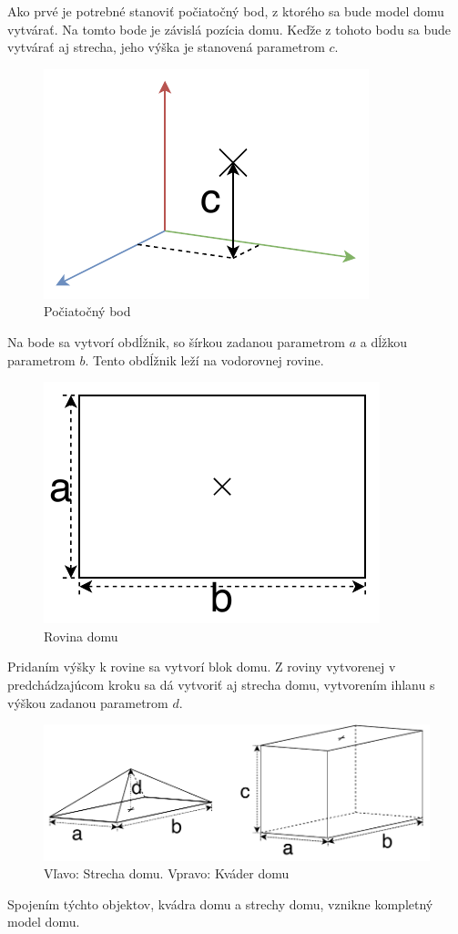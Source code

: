 Ako prvé je potrebné  stanoviť počiatočný bod, z ktorého sa bude model domu vytvárať. Na tomto bode je závislá pozícia domu. Keďže z tohoto bodu sa bude vytvárať aj strecha, jeho výška je stanovená parametrom $c$.\nopagebreak
\begin{figure}[H]
	\centering
	\includegraphics[height=0.3\textwidth]{obrazky-figures/Examples/B1.pdf}
	\caption{Počiatočný bod }
	\label{fig:B1}
\end{figure}
Na bode sa vytvorí obdĺžnik, so šírkou zadanou parametrom $a$ a dĺžkou parametrom $b$. Tento obdĺžnik leží na vodorovnej rovine.\nopagebreak
\begin{figure}[H]
	\centering
	\includegraphics[height=0.3\textwidth]{obrazky-figures/Examples/B2.pdf}
	\caption{Rovina domu}
	\label{fig:B2}
\end{figure}
Pridaním výšky k rovine sa vytvorí blok domu. Z roviny vytvorenej v predchádzajúcom kroku sa dá vytvoriť aj strecha domu, vytvorením ihlanu s výškou zadanou parametrom $d$. \nopagebreak
\begin{figure}[H]
	\centering
	\includegraphics[height=0.3\textwidth]{obrazky-figures/Examples/B3.pdf}
	\caption{Vľavo: Strecha domu. Vpravo: Kváder domu}
	\label{fig:B3}
\end{figure}
Spojením týchto objektov, kvádra domu a strechy domu, vznikne kompletný model domu.\nopagebreak
